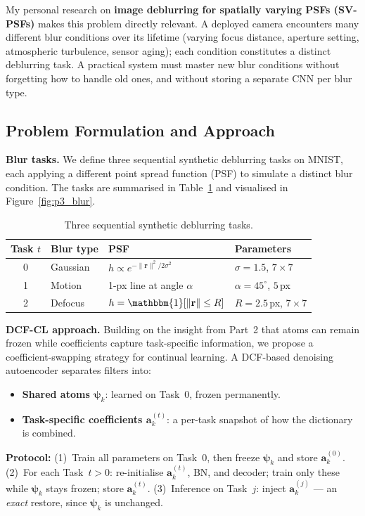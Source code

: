 \documentclass[11pt,letterpaper]{article}
\newcommand{\avec}{\mathbf{a}}
\newcommand{\psivec}{\boldsymbol{\psi}}
\begin{document}
My personal research on \textbf{image deblurring for spatially varying
PSFs (SV-PSFs)} makes this problem directly relevant.
A deployed camera encounters many different blur conditions over its
lifetime (varying focus distance, aperture setting, atmospheric
turbulence, sensor aging); each condition constitutes a distinct
deblurring task.  A practical system must master new blur conditions
without forgetting how to handle old ones, and without storing a
separate CNN per blur type.

\subsection{Problem Formulation and Approach}
\label{sec:p3_form}

\textbf{Blur tasks.}
We define three sequential synthetic deblurring tasks on MNIST, each
applying a different point spread function (PSF) to simulate a distinct
blur condition.  The tasks are summarised in Table~\ref{tab:p3_tasks}
and visualised in Figure~\ref{fig:p3_blur}.

\begin{table}[h]
\centering
\caption{Three sequential synthetic deblurring tasks.}
\label{tab:p3_tasks}
\begin{tabular}{clll}
\toprule
Task $t$ & Blur type & PSF & Parameters \\
\midrule
0 & Gaussian  & $h \propto e^{-\|\mathbf{r}\|^2/2\sigma^2}$ & $\sigma{=}1.5$, $7{\times}7$ \\
1 & Motion    & 1-px line at angle $\alpha$ & $\alpha{=}45^\circ$, $5$\,px \\
2 & Defocus   & $h = \mathbbm{1}[\|\mathbf{r}\| \le R]$ & $R{=}2.5$\,px, $7{\times}7$ \\
\bottomrule
\end{tabular}
\end{table}

\textbf{DCF-CL approach.}
Building on the insight from Part~2 that atoms can remain frozen while
coefficients capture task-specific information, we propose a
coefficient-swapping strategy for continual learning.
A DCF-based denoising autoencoder separates filters into:
\begin{itemize}[leftmargin=*]
  \item \textbf{Shared atoms $\psivec_k$}: learned on Task~0, frozen permanently.
  \item \textbf{Task-specific coefficients $\avec_k^{(t)}$}: a per-task
        snapshot of how the dictionary is combined.
\end{itemize}
\textbf{Protocol:}
(1)~Train all parameters on Task~0, then freeze $\psivec_k$ and store
$\avec_k^{(0)}$.
(2)~For each Task~$t > 0$: re-initialise $\avec_k^{(t)}$, BN, and decoder;
train only these while $\psivec_k$ stays frozen; store $\avec_k^{(t)}$.
(3)~Inference on Task~$j$: inject $\avec_k^{(j)}$ --- an \emph{exact} restore,
since $\psivec_k$ is unchanged.
\end{document}
